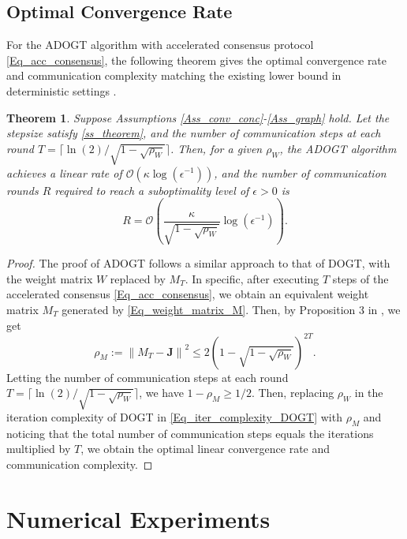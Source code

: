 \documentclass[10pt,a4paper]{amsart}
\newtheorem{Thm}{Theorem}
\begin{document}
\subsection{Optimal Convergence Rate}
For the ADOGT algorithm with accelerated consensus protocol \eqref{Eq_acc_consensus}, the following theorem gives the optimal convergence rate and communication complexity matching the existing lower bound in deterministic settings \cite{beznosikov2020distributed}.


\begin{Thm}\label{Thm_acc_DOGT}
Suppose Assumptions \ref{Ass_conv_conc}-\ref{Ass_graph} hold. Let the stepsize satisfy \eqref{ss_theorem}, and the number of communication steps at each round $T=\lceil \ln \left( 2 \right) /\sqrt{1-\sqrt{\rho _W}} \rceil $. Then, for a given $\rho_W$, the ADOGT algorithm achieves a linear rate of $\mathcal{O} \left( \kappa \log \left( \epsilon ^{-1} \right) \right) $, and the number of communication rounds $R$ required to reach a suboptimality level of $\epsilon >0$ is 
\begin{equation}
R=\mathcal{O} \left( \frac{\kappa}{\sqrt{1-\sqrt{\rho _W}}}\log \left( \epsilon ^{-1} \right) \right).
\end{equation}
\end{Thm}

\begin{proof}
The proof of ADOGT follows a similar approach to that of DOGT, with the weight matrix $W$ replaced by $M_T$. In specific, after executing $T$ steps of the accelerated consensus \eqref{Eq_acc_consensus}, we obtain an equivalent weight matrix $M_T$ generated by \eqref{Eq_weight_matrix_M}.
Then, by Proposition 3 in \cite{liu2011accelerated}, we get
\begin{equation}
\rho _M:=\left\| M_T-\mathbf{J} \right\| ^2\leqslant 2\left( 1-\sqrt{1-\sqrt{\rho _W}} \right) ^{2T}.
\end{equation}
Letting the number of communication steps at each round $T=\lceil \ln(2)/\sqrt{1-\sqrt{\rho _W}} \rceil $, we have $1-\rho _M \geqslant 1/2$. 
Then, replacing $\rho_W$ in the iteration complexity of DOGT in \eqref{Eq_iter_complexity_DOGT} with $\rho_M$ and noticing that the total number of communication steps equals the iterations multiplied by $T$, we obtain the optimal linear convergence rate and communication complexity.
\end{proof}


\section{Numerical Experiments}\label{Sec_experiment}
\end{document}
